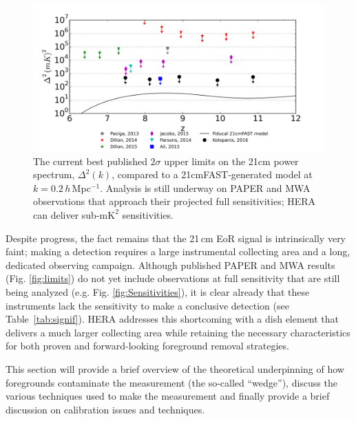 \documentclass[preprint,11pt]{aastex}
\begin{document}
\begin{figure}[t]
	\centering
	\includegraphics[width=.8\textwidth]{plots/summary_results.png}
	\caption{The current best published $2\sigma$ upper limits on the 21cm power spectrum, $\Delta^2(k)$, compared to a 21cmFAST-generated model at $k=0.2$\,$h$\,Mpc$^{-1}$.   Analysis is still underway on PAPER and MWA observations that approach their projected full sensitivities;  HERA can deliver sub-$\text{mK}^2$ sensitivities.}
	\vspace{-10pt}
	\label{fig:limits}
	\label{fig:IGMtemperatureConstraints}
\end{figure}

Despite progress, the fact remains that the 21\,cm EoR signal is intrinsically very faint; making a detection requires a
large instrumental collecting area and a long, dedicated observing campaign.
Although published PAPER and MWA results (Fig. \ref{fig:limits}) do not yet include observations 
at full sensitivity that are still being analyzed (e.g. Fig. \ref{fig:Sensitivities}), 
it is clear already that these instruments lack the sensitivity
to make a conclusive detection (see Table~\ref{tab:signif}). 
HERA addresses this shortcoming with a dish element that delivers a much larger collecting area 
while retaining the necessary characteristics for both proven and forward-looking foreground removal strategies.

This section will provide a brief overview of  the theoretical underpinning of how foregrounds contaminate the measurement (the so-called ``wedge''), discuss the various techniques used to make the measurement and finally provide a brief discussion on calibration issues and techniques.
\end{document}
